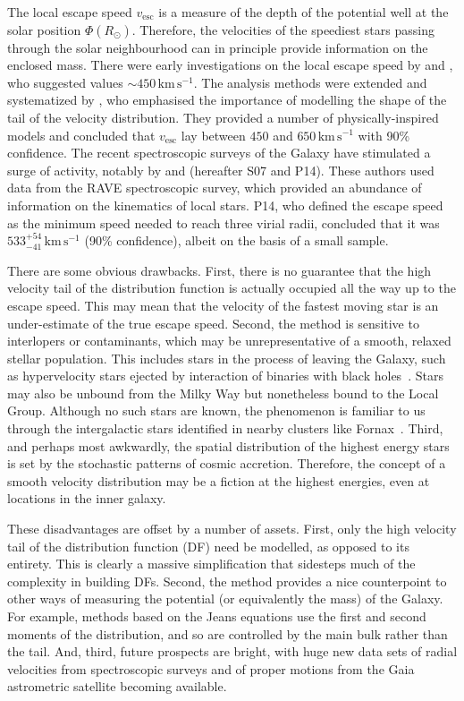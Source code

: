 \documentclass[useAMS,twocolumn,usenatbib]{mn2e}
\def\kms{{\,\mathrm{km\,s^{-1}}}}
\def\vesc{{v_\mathrm{esc}}}
\begin{document}
The local escape speed $\vesc$ is a measure of the depth of the potential well at the solar position $\Phi(R_\odot)$. 
Therefore, the velocities of the speediest stars passing through the solar neighbourhood can in principle provide information on the enclosed mass. 
There were early investigations on the local escape speed by \citet{Ca81} and \citet{Al82}, who suggested values $\sim 450\kms$.
The analysis methods were extended and systematized by \citet{Le90}, who emphasised the importance of modelling the shape of the tail of the velocity distribution. 
They provided a number of physically-inspired models and concluded that $\vesc$ lay between $450$ and $650 \kms$ with 90\% confidence. 
The recent spectroscopic surveys of the Galaxy have stimulated a surge of activity, notably by \cite{Sm07} and \cite{Pi14} (hereafter S07 and P14).
These authors used data from the RAVE spectroscopic survey, which provided an abundance of information on the kinematics of local stars. 
P14, who defined the escape speed as the minimum speed needed to reach three virial radii, concluded that it was $533^{+54}_{-41} \kms$ (90\% confidence), albeit on the basis of a small sample.

There are some obvious drawbacks. First, there is no guarantee that the high velocity tail of the distribution function is actually occupied all the way up to the escape speed. 
This may mean that the velocity of the fastest moving star is an under-estimate of the true escape speed. 
Second, the method is sensitive to interlopers or contaminants, which may be unrepresentative of a smooth, relaxed stellar population. 
This includes stars in the process of leaving the Galaxy, such as hypervelocity stars ejected by interaction of binaries with black holes~\citep[e.g.,][]{Br15,Bou16}. 
Stars may also be unbound from the Milky Way but nonetheless bound to the Local Group. 
Although no such stars are known, the phenomenon is familiar to us through the intergalactic stars identified in nearby clusters like Fornax~\citep{Th97}. 
Third, and perhaps most awkwardly, the spatial distribution of the highest energy stars is set by the stochastic patterns of cosmic accretion. 
Therefore, the concept of a smooth velocity distribution may be a fiction at the highest energies, even at locations in the inner galaxy.

These disadvantages are offset by a number of assets. First, only the high velocity tail of the distribution function (DF) need be modelled, as opposed to its entirety. 
This is clearly a massive simplification that sidesteps much of the complexity in building DFs. 
Second, the method provides a nice counterpoint to other ways of measuring the potential (or equivalently the mass) of the Galaxy. 
For example, methods based on the Jeans equations use the first and second moments of the distribution, and so are controlled by the main bulk rather than the tail. 
And, third, future prospects are bright, with huge new data sets of radial velocities from spectroscopic surveys and of proper motions from the Gaia astrometric satellite becoming available.
\end{document}
